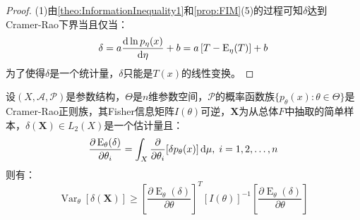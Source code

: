 \begin{proof}
	(1)由\cref{theo:InformationInequality1}和\cref{prop:FIM}(5)的过程可知$\delta$达到Cramer-Rao下界当且仅当：
	\begin{equation*}
		\delta=a\frac{\mathop{}\!\mathrm{d}\ln p_{\eta}(x)}{\mathop{}\!\mathrm{d}\eta}+b=a\left[T-\operatorname{E}_{\eta}(T)\right]+b
	\end{equation*}
	为了使得$\delta$是一个统计量，$\delta$只能是$T(x)$的线性变换。
\end{proof}
\begin{theorem}\label{theo:InformationInequalityn}
	设$(X,\mathscr{A},\mathscr{P})$是参数结构，$\Theta$是$n$维参数空间，$\mathscr{P}$的概率函数族$\{p_{\theta}(x):\theta\in\Theta\}$是Cramer-Rao正则族，其Fisher信息矩阵$I(\theta)$可逆，$\mathbf{X}$为从总体$F$中抽取的简单样本，$\delta(\mathbf{X})\in L_2(X)$是一个估计量且：
	\begin{equation*}
		\frac{\partial\operatorname{E}_{\theta}(\delta)}{\partial\theta_i}=\int_{X}\frac{\partial}{\partial\theta_i}[\delta p_{\theta}(x)]\mathop{}\!\mathrm{d}\mu,\;i=1,2,\dots,n
	\end{equation*}
	则有：
	\begin{equation*}
		\operatorname{Var}_{\theta}[\delta(\mathbf{X})]\geqslant\left[\frac{\partial\operatorname{E}_{\theta}(\delta)}{\partial\theta}\right]^T[I(\theta)]^{-1}\left[\frac{\partial\operatorname{E}_{\theta}(\delta)}{\partial\theta}\right]
	\end{equation*}
\end{theorem}
